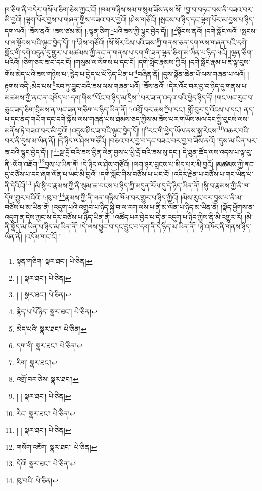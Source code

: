 ཁ་ཅིག་ནི་བདེར་གསོལ་ཅིག་ཅེས་ཀྱང་ངོ། །ཁམ་གཉིས་སམ་གསུམ་ཟོས་ནས་སོ། །བྱ་བ་བཏང་བས་ནི་བཟའ་བར་མི་བྱའོ། །ལྷག་པོར་བྱས་པ་གཞན་གྱིས་བཟའ་བར་བྱའོ། །ཤེས་གཙོའོ། །སྤངས་པ་ཉིད་དང་ལྷག་པོར་མ་བྱས་པ་ཉིད་དག་ལའོ། །ཟོས་ནའོ། །ཟས་ཙམ་མོ། །:ལྷན་ཅིག་\footnote{སྟན་གཅིག་  སྣར་ཐང་།  པེ་ཅིན། }པའི་ཟས་ཀྱི་ལྟུང་བྱེད་དོ།། །།\footnote{། །  སྣར་ཐང་།  པེ་ཅིན། }སྟོབས་ནའོ། །དགེ་སློང་ལའོ། །སྤངས་པ་ལ་སྟོབས་པའི་ལྟུང་བྱེད་དོ།། །།\footnote{། །  སྣར་ཐང་།  པེ་ཅིན། }ཤེས་གཙོའོ། །སོ་སོར་ངེས་པའི་ཟས་ཀྱི་གནས་ཅན་དག་ལས་གཞན་པའི་དགེ་སློང་གི་དགེ་འདུན་དུ་གྱུར་པ་མཚམས་ཀྱི་ནང་ན་གནས་པ་དག་གི་ཟན་ལྷན་ཅིག་མ་ཡིན་པ་ཉིད་ལའོ། །ལྷན་ཅིག་པའིའོ། །ཅིག་ཅར་ཟ་བ་དང་ངོ། །གསུམ་ལ་སོགས་པ་དང་ངོ། །དགེ་སློང་རྣམས་ཀྱིའོ། །དགེ་སློང་རྣམ་པ་ཇི་ལྟ་བུས་གོས་མེད་པའི་ཟས་གཉིས་པ་:རྙེད་པ་བྱེད་པ་པོ་ཉིད་ཡིན་པ་\footnote{རྙེད་པ་པོ་ཉིད་  སྣར་ཐང་།  པེ་ཅིན། }བཞིན་ནོ། །དུས་སྟོན་ཆེན་པོ་ལས་གཞན་པ་ལའོ། །རྟགས་འདི་:མེད་པས་\footnote{མེད་པའི་  སྣར་ཐང་།  པེ་ཅིན། }རབ་ཏུ་བྱུང་བའི་ཟས་ལས་གཞན་པའོ། །ཟོས་ནའོ། །དེར་འོང་བར་བྱ་བ་ཉིད་དུ་གནས་པ་མཚམས་ཀྱི་ནང་ན་འཁོད་པ་:དག་གིས་\footnote{དག་གི་  སྣར་ཐང་།  པེ་ཅིན། }འོང་བ་ཉིད་མ་དྲིས་\footnote{རིག་  སྣར་ཐང་། }པར་ཟ་ན་འདའ་བའི་ཕྱེད་ཉིད་དོ། །གང་ཡང་རུང་བ་ཅུང་ཟད་ཅིག་བྲིམས་ན་ཡང་ཟན་གཅིག་པ་ཉིད་ཡིན་ནོ། །:འགྲོ་བར་ཆས་\footnote{འགྲོ་བར་ཅེས་  སྣར་ཐང་། }པ་དང་། གློ་བུར་དུ་འོངས་པ་དང་། ནད་པ་དང་ནད་གཡོག་དང་དགེ་སྐོས་ལས་གཞན་པས་ཐམས་ཅད་ཀྱིས་མ་ཟོས་པར་གཡོས་མལ་དང་སྤྱི་བུངས་ལས་མནོས་ཏེ་བཟའ་བར་མི་བྱའོ། །འདུས་ཤིང་ཟ་བའི་ལྟུང་བྱེད་དོ།། །།\footnote{། །  སྣར་ཐང་།  པེ་ཅིན། }རང་གི་ཕྱེད་ཡོལ་ནས་སྐྱ་རེངས་\footnote{རེང་  སྣར་ཐང་།  པེ་ཅིན། }འཆར་བའི་བར་ནི་དུས་མ་ཡིན་ནོ། །དེ་ཉིད་ལ་ཤེས་གཙོའོ། །བཅའ་བར་བྱ་བ་དང་བཟའ་བར་བྱ་བ་ཟོས་ནའོ། །དུས་མ་ཡིན་པར་ཟ་བའི་ལྟུང་བྱེད་དོ།། །།\footnote{། །  སྣར་ཐང་།  པེ་ཅིན། }སྔ་དྲོ་བའི་ཟས་བྱིན་ལེན་བྱས་པ་ཕྱི་དྲོ་བའི་ཟས་སུ་དང་། དེ་ཐུན་ཚོད་ལས་འདས་པ་ལྟ་བུ་ནི་:སོག་འཇོག་\footnote{གསོག་འཇོག་  སྣར་ཐང་།  པེ་ཅིན། }བྱས་པ་ཡིན་ནོ། །དེ་ཉིད་ལ་ཤེས་གཙོའོ། །ལག་ཉར་བླངས་པ་མིད་པར་མི་བྱའོ། །མཚམས་ཀྱི་ནང་དུ་བཙོས་པ་དང་ཞག་ལོན་པ་ཡང་མི་བྱའོ། །དགེ་སློང་གིས་བཙོས་པ་ཡང་ངོ། །འདིར་རྗེན་པ་བཙོས་པ་གང་ཡིན་པ་ནི་དེའིའོ།\footnote{དེའོ།  སྣར་ཐང་།  པེ་ཅིན། } །མི་སྙི་བ་རྣམས་ཀྱི་ནི་སུམ་ཆ་བངས་པ་ཉིད་ཀྱི་མདུན་རོལ་དུ་དེ་ཉིད་ཡིན་ནོ། །སྙི་བ་རྣམས་ཀྱི་ནི་ཁ་དོག་གྱུར་པའིའོ། །:ཁུ་བ་\footnote{ཁུ་བའི་  པེ་ཅིན། }རྣམས་ཀྱི་ནི་ལན་གཉིས་ཁོལ་བར་གྱུར་པ་ཉིད་ཀྱིའོ། །མེས་རུང་བར་བྱས་པ་ནི་མ་བཙོས་པ་མ་ཡིན་ནོ། །འདུག་པའི་འགྲུབ་པ་ཉིད་སྐྱེ་བ་ལ་རག་ལས་པ་ནི་མ་ལོན་པ་ཉིད་མ་ཡིན་ནོ། །སྣོད་ཕྱོགས་ན་འདུག་ན་དེས་ཀྱང་ས་དེར་བཙོས་པ་ཉིད་ཡིན་ནོ། །འཚོད་པར་བྱེད་པ་དེ་ན་འདུག་པ་ཉིད་ཀྱིས་ནི་མི་འགྱུར་རོ། །མེ་ནི་སྣོད་མ་ཡིན་པ་ཉིད་མ་ཡིན་ནོ། །དེ་ལས་ཕྱུང་བ་དང་བྱུང་བ་དག་ནི་དེ་ཉིད་མ་ཡིན་ནོ། །ཉེ་འཁོར་ནི་གནས་ཉིད་ཡིན་ནོ། །འདོམ་གང་ངོ། །
